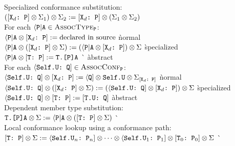 \documentclass[../generics]{subfiles}
\begin{document}
\begin{tabbing}
Specialized conformance substitution:\\
\qquad $([\texttt{$\texttt{X}_d$:~P}] \otimes \Sigma_1) \otimes \Sigma_2 := [\texttt{$\texttt{X}_d$:~P}] \otimes (\Sigma_1 \otimes \Sigma_2)$\\[\medskipamount]
For each $\langle\texttt{P}|\texttt{A} \in \textsc{AssocType}_{\texttt{P}}$:\\
\qquad $\langle\texttt{P}|\texttt{A}\otimes [\texttt{$\texttt{X}_d$:~P}] := \text{declared in source}$ \` normal\\
\qquad $\langle\texttt{P}|\texttt{A}\otimes ([\texttt{$\texttt{X}_d$:~P}]\otimes \Sigma) := (\langle\texttt{P}|\texttt{A}\otimes [\texttt{$\texttt{X}_d$:~P}]) \otimes \Sigma$ \` specialized\\
\qquad $\langle\texttt{P}|\texttt{A} \otimes [\texttt{T:~P}] := \texttt{T.[P]A}$ \`  \` abstract\\[\medskipamount]
For each $\langle\texttt{Self.U:~Q}] \in \textsc{AssocConf}_{\texttt{P}}$:\\
\qquad $\langle\texttt{Self.U:~Q}]\otimes [\texttt{$\texttt{X}_d$:~P}] := \langle\texttt{Q}] \otimes \texttt{Self.U} \otimes \Sigma_{[\texttt{$\texttt{X}_d$:~P}]}$ \` normal\\
\qquad $\langle\texttt{Self.U:~Q}]\otimes ([\texttt{$\texttt{X}_d$:~P}] \otimes \Sigma) := (\langle\texttt{Self.U:~Q}] \otimes [\texttt{$\texttt{X}_d$:~P}]) \otimes \Sigma$ \` specialized\\
\qquad $\langle\texttt{Self.U:~Q}] \otimes [\texttt{T:~P}] := [\texttt{T.U:~Q}]$ \` abstract\\[\medskipamount]
Dependent member type substitution:\\
\qquad $\texttt{T.[P]A} \otimes \Sigma := \langle\texttt{P}|\texttt{A} \otimes ([\texttt{T:~P}] \otimes \Sigma)$ \` \\[\medskipamount]
Local conformance lookup using a conformance path:\\
\qquad $[\texttt{T:~P}] \otimes \Sigma :=
\langle\texttt{Self.$\texttt{U}_n$:~$\texttt{P}_n$}]
\otimes
\cdots
\otimes
\langle\texttt{Self.$\texttt{U}_1$:~$\texttt{P}_1$}]
\otimes
[\texttt{$\texttt{T}_0$:~$\texttt{P}_0$}] \otimes \Sigma$ \` 
\end{tabbing}
\end{document}
